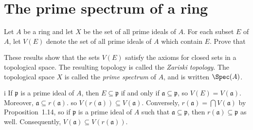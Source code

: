 \section{The prime spectrum of a ring}

\begin{exercise}
Let \(A\) be a ring and let \(X\) be the set of all prime ideals of \(A\).
For each subset \(E\) of \(A\), let \(V(E)\) denote the set of all prime ideals of \(A\) which contain \(E\).
Prove that
These results show that the sets \(V(E)\) satisfy the axioms for closed sets in a topological space.
The resulting topology is called the \emph{Zariski topology}.
The topological space \(X\) is called the \emph{prime spectrum} of \(A\), and is written \(\Spec(A)\).
\end{exercise}

\begin{partsolution}{1}{15}{i}
If \(\mathfrak{p}\) is a prime ideal of \(A\), then \(E \subseteq \mathfrak{p}\) if and only if \(\mathfrak{a} \subseteq \mathfrak{p}\), so \(V(E) = V(\mathfrak{a})\).
Moreover, \(\mathfrak{a} \subseteq r(\mathfrak{a})\). so \(V(r(\mathfrak{a})) \subseteq V(\mathfrak{a})\).
Conversely, \(r(\mathfrak{a}) = \bigcap V(\mathfrak{a})\) by Proposition~1.14, so if \(\mathfrak{p}\) is a prime ideal of \(A\) such that \(\mathfrak{a} \subseteq \mathfrak{p}\), then \(r(\mathfrak{a}) \subseteq \mathfrak{p}\) as well.
Consequently, \(V(\mathfrak{a}) \subseteq V(r(\mathfrak{a}))\).
\end{partsolution}

